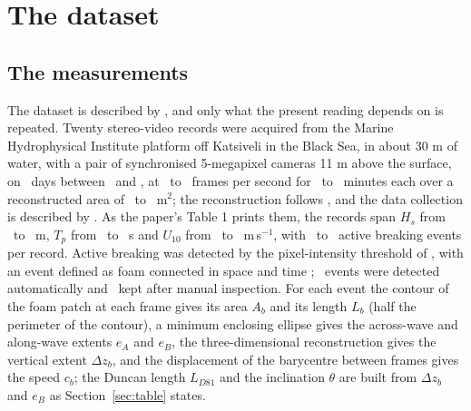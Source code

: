 \documentclass[preprint,11pt,authoryear]{elsarticle}
\begin{document}
\section{The dataset}\label{sec:data}

\subsection{The measurements}
The dataset is described by \citet{guimaraes2026}, and only what the present reading depends on is repeated. Twenty stereo-video records were acquired from the Marine Hydrophysical Institute platform off Katsiveli in the Black Sea, in about 30 m of water, with a pair of synchronised 5-megapixel cameras 11 m above the surface, on \RecordDays\ days between \RecordFirst\ and \RecordLast, at \FpsLo\ to \FpsHi\ frames per second for \DurLo\ to \DurHi\ minutes each over a reconstructed area of \AreaLo\ to \AreaHi\ m$^2$; the reconstruction follows \citet{benetazzo2006,benetazzo2012}, and the data collection is described by \citet{guimaraes2020}. As the paper's Table 1 prints them, the records span $H_s$ from \HsPrintedLo\ to \HsPrintedHi\ m, $T_p$ from \TpPrintedLo\ to \TpPrintedHi\ s and $U_{10}$ from \UPrintedLo\ to \UPrintedHi\ m\,s$^{-1}$, with \NbLo\ to \NbHi\ active breaking events per record. Active breaking was detected by the pixel-intensity threshold of \citet{mironov2008}, with an event defined as foam connected in space and time \citep{kleiss2011}; \InitiallyDetected\ events were detected automatically and \NEvents\ kept after manual inspection. For each event the contour of the foam patch at each frame gives its area $A_b$ and its length $L_b$ (half the perimeter of the contour), a minimum enclosing ellipse gives the across-wave and along-wave extents $e_A$ and $e_B$, the three-dimensional reconstruction gives the vertical extent $\Delta z_b$, and the displacement of the barycentre between frames gives the speed $c_b$; the Duncan length $L_{D81}$ and the inclination $\theta$ are built from $\Delta z_b$ and $e_B$ as Section~\ref{sec:table} states.
\end{document}
